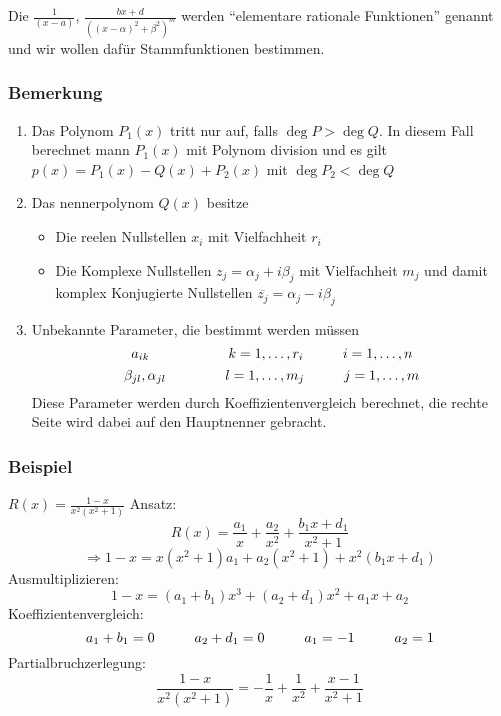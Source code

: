 Die $\frac{1}{(x-a)}$, $\frac{bx+d}{\left( (x-\alpha )^2 +\beta ^2\right)^m}$ werden ``elementare rationale Funktionen'' genannt und wir wollen dafür Stammfunktionen bestimmen.

\subsubsection*{Bemerkung}

\begin{enumerate}
\item Das Polynom $P_1(x)$ tritt nur auf, falls $\deg P>\deg Q$. In diesem Fall berechnet mann $P_1(x)$ mit Polynom division und es gilt $p(x)=P_1(x)-Q(x)+P_2(x)$ mit $\deg P_2 < \deg Q$
\item Das nennerpolynom $Q(x)$ besitze
\begin{itemize}
\item Die reelen Nullstellen $x_i$ mit Vielfachheit $r_i$
\item Die Komplexe Nullstellen $z_j=\alpha _j+i\beta_j$ mit Vielfachheit $m_j$ und damit komplex Konjugierte Nullstellen $\overline{z_j}=\alpha _j-i\beta _j$
\end{itemize}
\item Unbekannte Parameter, die bestimmt werden müssen
$$a_{ik}\text{\hspace{20mm}}k=1,\dots ,r_i\text{\hspace{10mm}}i=1,\dots,n$$
$$\beta _{jl},\alpha _{jl}\text{\hspace{15mm}}l=1,\dots ,m_j\text{\hspace{10mm}}j=1,\dots,m$$
Diese Parameter werden durch Koeffizientenvergleich berechnet, die rechte Seite wird dabei auf den Hauptnenner gebracht.
\end{enumerate}
\subsubsection{Beispiel}
$R(x)=\frac{1-x}{x^2(x^2+1)}$
Ansatz: $$R(x)=\frac{a_1}{x}+\frac{a_2}{x^2}+\frac{b_1x+d_1}{x^2+1}$$$$\Rightarrow 1-x=x(x^2+1)a_1+a_2(x^2+1)+x^2(b_1x+d_1)$$
Ausmultiplizieren:
$$1-x=(a_1+b_1)x^3+(a_2+d_1)x^2+a_1x+a_2$$
Koeffizientenvergleich:
$$a_1+b_1=0\text{\hspace{10mm}}a_2+d_1=0\text{\hspace{10mm}}a_1=-1\text{\hspace{10mm}}a_2=1$$
Partialbruchzerlegung:
$$\frac{1-x}{x^2(x^2+1)}=-\frac{1}{x}+\frac{1}{x^2}+\frac{x-1}{x^2+1}$$
